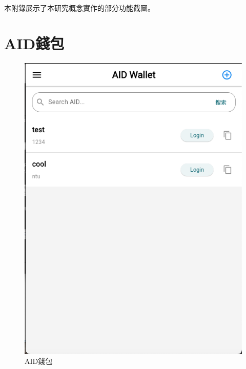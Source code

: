 
本附錄展示了本研究概念實作的部分功能截圖。
\section{AID錢包}
\begin{figure}
  \centering
  \includegraphics[width=\linewidth]{figures/wallet-demo.png}
  \caption{AID錢包}
  \label{fig:appendix-wallet}
\end{figure}
\clearpage

